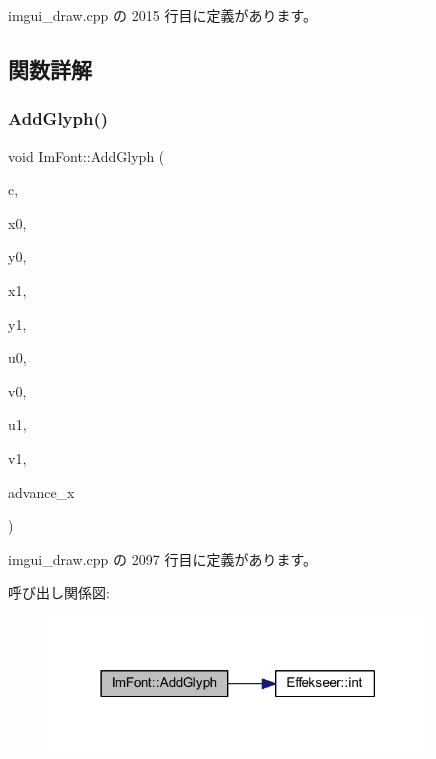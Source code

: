  imgui\+\_\+draw.\+cpp の 2015 行目に定義があります。



\subsection{関数詳解}
\mbox{\label{struct_im_font_ae63d3d343052336d7718aacac8f394b7}} 
\subsubsection{\texorpdfstring{Add\+Glyph()}{AddGlyph()}}
{\footnotesize\ttfamily void Im\+Font\+::\+Add\+Glyph (\begin{DoxyParamCaption}\item[{\mbox{\hyperlink{imgui_8h_af2c7badaf05a0008e15ef76d40875e97}{Im\+Wchar}}}]{c,  }\item[{float}]{x0,  }\item[{float}]{y0,  }\item[{float}]{x1,  }\item[{float}]{y1,  }\item[{float}]{u0,  }\item[{float}]{v0,  }\item[{float}]{u1,  }\item[{float}]{v1,  }\item[{float}]{advance\+\_\+x }\end{DoxyParamCaption})}



 imgui\+\_\+draw.\+cpp の 2097 行目に定義があります。

呼び出し関係図\+:\nopagebreak
\begin{figure}[H]
\begin{center}
\leavevmode
\includegraphics[width=285pt]{struct_im_font_ae63d3d343052336d7718aacac8f394b7_cgraph}
\end{center}
\end{figure}
\mbox{\label{struct_im_font_aba8cd20f14ba47175d45d3f2063aa329}} 

